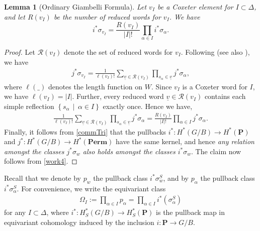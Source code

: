 \documentclass[10pt]{article}
\numberwithin{thm}{section}
\newtheorem{lemma}[thm]{Lemma}
\theoremstyle{definition}
\theoremstyle{remark}
\newcommand{\Pet}{\ensuremath{\mathbf{P}}}
\newcommand{\Perm}{\ensuremath{\mathbf{Perm}}}
\newcommand{\Fl}{\ensuremath{G/B}}
\newcommand{\set}[2]{\left\{#1\,\middle\vert\,#2\right\}}
\begin{document}
\begin{lemma}[Ordinary Giambelli Formula]
\label{klyachkoFormula}
Let $v_I$ be a Coxeter element for $I\subset\Delta$,
and let $R(v_I)$ be the number of reduced words for $v_I$.
We have
\begin{equation}
i^*\sigma_{v_I}=\frac{R(v_I)}{|I|!}\prod_{\alpha\in I}i^*\sigma_\alpha.
\end{equation}
\end{lemma}
\begin{proof}
Let $\mathcal R(v_I)$ denote the set of reduced words for $v_I$.
Following \cite{klyachko85,klyachko95} (see also \cite[Thm 8.1]{nadeau.tewari}),
we have
\begin{align*}
j^*\sigma_{v_I}=\frac{1}{\ell(v_I)!}\sum_{\underline v\in\mathcal R(v_I)}\prod_{s_\alpha\in\underline v}j^*\sigma_\alpha,
\end{align*}
where $\ell(\_)$ denotes the length function on $W$.
Since $v_I$ is a Coxeter word for $I$,
we have $\ell(v_I)=|I|$.
Further,
every reduced word $\underline v\in\mathcal R(v_I)$ contains each simple reflection $\set{s_\alpha}{\alpha\in I}$ exactly once.
Hence we have,
\begin{align}
\label{work4}
\frac{1}{\ell(v_I)!}\sum_{\underline v\in\mathcal R(v_I)}\prod_{s_\alpha\in\underline v}j^*\sigma_\alpha
=\frac{R(v_I)}{|I|!}\prod_{\alpha\in I}j^*\sigma_\alpha.
\end{align}
Finally, it follows from \cref{commTri} %
that the pullbacks $i^*:H^*(G/B)\to H^*(\Pet)$ and $j^*:H^*(G/B)\to H^*(\Perm)$ have the same kernel,
and hence \emph{any relation amongst the classes $j^*\sigma_w$ also holds amongst the classes $i^*\sigma_w$}.
The claim now follows from \cref{work4}.
\end{proof}

Recall that we denote by $p_w$ the pullback class $i^*\sigma_w^S$,
and by $p_\alpha$ the pullback class $i^*\sigma_{\alpha}^S$.
For convenience, we write the equivariant class
\begin{align*}
\Omega_I:=\prod_{\alpha\in I}p_\alpha = \prod_{\alpha\in I}i^*(\sigma^S_{\alpha})
\end{align*}
for any $I\subset\Delta$, where $i^*: H_S^*(G/B)\rightarrow H^*_S(\Pet)$ is the pullback map in equivariant cohomology induced by the inclusion $i:\Pet\to G/B$.
\end{document}
